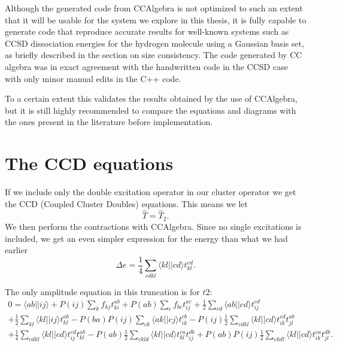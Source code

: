 Although the generated code from CCAlgebra is not optimized to such an extent that it will be usable for the system we explore in this thesis, it is fully capable to generate code that reproduce accurate results for well-known systems such as CCSD dissociation energies for the hydrogen molecule using a Gaussian basis set, as briefly described in the section on size consistency. The code generated by CC algebra was in exact agreement with the handwritten code in the CCSD case with only minor manual edits in the C++ code.

To a certain extent this validates the results obtained by the use of CCAlgebra, but it is still highly recommended to compare the equations and diagrams with the ones present in the literature before implementation.

\section{The CCD equations}

If we include only the double excitation operator in our cluster operator we get the CCD (Coupled Cluster Doubles) equations. This means we let 
\begin{equation}
\hat{T} = \hat{T}_2.
\end{equation}
We then perform the contractions with CCAlgebra. Since no single
excitations is included, we get an even simpler expression for the
energy than what we had earlier
\begin{equation}
\Delta e = \frac{1}{4} \sum_{cdkl} \langle kl || cd \rangle t_{kl}^{cd}.
\end{equation}

The only amplitude equation in this truncation is for $t2$:
\begin{multline}
0 =\langle ab \vert \vert ij \rangle + 
P(ij) \sum_{k} f_{kj} t_{ki}^{ab}+P(ab) \sum_{c} f_{bc} t_{ij}^{ac}+
\frac{1}{2} \sum_{cd} \langle ab \vert \vert cd \rangle t_{ij}^{cd} \\
+\frac{1}{2} \sum_{kl} \langle kl \vert \vert ij \rangle t_{kl}^{ab}-
P(ba)P(ij) \sum_{ck} \langle ak \vert \vert cj \rangle t_{ik}^{cb}- 
P(ij)\frac{1}{2} \sum_{cdkl} \langle kl \vert \vert cd \rangle t_{ik}^{cd} t_{jl}^{ab}\\
+\frac{1}{4} \sum_{cdkl} \langle kl \vert \vert cd \rangle t_{ij}^{cd} t_{kl}^{ab}-
 P(ab)\frac{1}{2} \sum_{ckld} \langle kl \vert \vert cd \rangle t_{kl}^{ca} t_{ij}^{db}+
P(ab)P(ij)\frac{1}{2} \sum_{ckdl} \langle kl \vert \vert cd \rangle t_{ik}^{ca} t_{jl}^{db}.
\end{multline}

